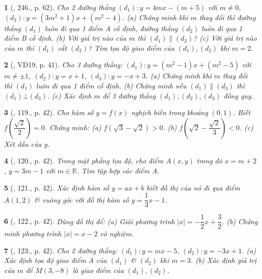 \documentclass{article}
\newtheorem{baitoan}{}
\begin{document}
\begin{baitoan}[\cite{Tuyen_Toan_8}, 246., p. 62]
	Cho 2 đường thẳng $(d_1):y = 4mx - (m + 5)$ với $m\ne0$, $(d_2):y = (3m^2 + 1)x + (m^2 - 4)$. (a) Chứng minh khi $m$ thay đổi thì đường thẳng $(d_1)$ luôn đi qua 1 điểm A cố định, đường thẳng $(d_2)$ luôn đi qua 1 điểm B cố định. (b) Với giá trị nào của $m$ thì $(d_1)\parallel(d_2)$? (c) Với giá trị nào của $m$ thì $(d_1)$ cắt $(d_2)$? Tìm tọa độ giao điểm của $(d_1),(d_2)$ khi $m = 2$.
\end{baitoan}

\begin{baitoan}[\cite{Tuyen_Toan_9_old}, VD19, p. 41]
	Cho 3 đường thẳng: $(d_1):y = (m^2 - 1)x + (m^2 - 5)$ với $m\ne\pm1$, $(d_2):y = x + 1$, $(d_3):y = -x + 3$. (a) Chứng minh khi $m$ thay đổi thì $(d_1)$ luôn đi qua 1 điểm cố định. (b) Chứng minh nếu $(d_1)\parallel(d_3)$ thì $(d_1)\bot(d_3)$. (c) Xác định $m$ để 3 đường thẳng $(d_1),(d_2),(d_3)$ đồng quy.
\end{baitoan}

\begin{baitoan}[\cite{Tuyen_Toan_9_old}, 119., p. 42]
	Cho hàm số $y = f(x)$ nghịch biến trong khoảng $(0,1)$. Biết $f\left(\dfrac{\sqrt{2}}{2}\right) = 0$. Chứng minh: (a) $f(\sqrt{3} - \sqrt{2}) > 0$. (b) $f\left(\sqrt{2} - \dfrac{\sqrt{2}}{3}\right) < 0$. (c) Xét dấu của $y$.
\end{baitoan}

\begin{baitoan}[\cite{Tuyen_Toan_9_old}, 120., p. 42]
	Trong mặt phẳng tọa độ, cho điểm $A(x,y)$ trong đó $x = m + 2$, $y = 3m - 1$ với $m\in\mathbb{R}$. Tìm tập hợp các điểm A.
\end{baitoan}

\begin{baitoan}[\cite{Tuyen_Toan_9_old}, 121., p. 42]
	Xác định hàm số $y = ax + b$ biết đồ thị của nó đi qua điểm $A(1,2)$ \& vuông góc với đồ thị hàm số $y = \dfrac{1}{3}x - 1$.
\end{baitoan}

\begin{baitoan}[\cite{Tuyen_Toan_9_old}, 122., p. 42]
	Dùng đồ thị để: (a) Giải phương trình $|x| = -\dfrac{1}{2}x + \dfrac{3}{2}$. (b) Chứng minh phương trình $|x| = x - 2$ vô nghiệm.
\end{baitoan}

\begin{baitoan}[\cite{Tuyen_Toan_9_old}, 123., p. 42]
	Cho 2 đường thẳng: $(d_1): y = mx - 5$, $(d_2):y = -3x + 1$. (a) Xác định tọa độ giao điểm A của $(d_1)$ \& $(d_2)$ khi $m = 3$. (b) Xác định giá trị của $m$ để $M(3,-8)$ là giao điểm của $(d_1),(d_2)$.
\end{baitoan}
\end{document}
